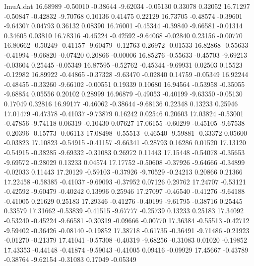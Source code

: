 \begin{filecontents}{ImuA.dat}
  16.68989   -0.50010   -0.38644   -9.62034   -0.05130    0.33078    0.32052
  16.71297   -0.50847   -0.42832   -9.70768    0.10136    0.41475    0.22129
  16.73705   -0.48574   -0.39601   -9.64307    0.04793    0.36132    0.08390
  16.76001   -0.45344   -0.39840   -9.66581   -0.01314    0.34605    0.03810
  16.78316   -0.45224   -0.42592   -9.64068   -0.02840    0.23156   -0.00770
  16.80662   -0.50249   -0.41157   -9.60479   -0.12763    0.26972   -0.01533
  16.82868   -0.55633   -0.41994   -9.66820   -0.07420    0.20866   -0.00006
  16.85276   -0.55633   -0.45703   -9.69213   -0.03604    0.25445   -0.05349
  16.87595   -0.52762   -0.45344   -9.69931    0.02503    0.15523   -0.12982
  16.89922   -0.44865   -0.37328   -9.63470   -0.02840    0.14759   -0.05349
  16.92244   -0.48455   -0.33260   -9.66102   -0.00551    0.19339    0.10680
  16.94564   -0.53958   -0.35055   -9.68854    0.05556    0.20102    0.28999
  16.96879   -0.49053   -0.40199   -9.63350   -0.05130    0.17049    0.32816
  16.99177   -0.46062   -0.38644   -9.68136    0.22348    0.13233    0.25946
  17.01479   -0.47378   -0.41037   -9.73879    0.16242    0.02546    0.20603
  17.03824   -0.53001   -0.47856   -9.74118    0.06319   -0.10430    0.07627
  17.06155   -0.60299   -0.45105   -9.67538   -0.20396   -0.15773   -0.06113
  17.08498   -0.55513   -0.46540   -9.59881   -0.33372    0.05600   -0.03823
  17.10823   -0.54915   -0.41157   -9.66341   -0.28793    0.16286    0.01520
  17.13120   -0.54915   -0.38285   -9.69332   -0.31083    0.26972    0.11443
  17.15448   -0.54078   -0.35653   -9.69572   -0.28029    0.13233    0.04574
  17.17752   -0.50608   -0.37926   -9.64666   -0.34899   -0.02033    0.11443
  17.20129   -0.59103   -0.37926   -9.70529   -0.24213    0.20866    0.21366
  17.22458   -0.58385   -0.41037   -9.69093   -0.37952    0.07126    0.29762
  17.24707   -0.53121   -0.42592   -9.60479   -0.40242    0.13996    0.25946
  17.27097   -0.46540   -0.41276   -9.64188   -0.41005    0.21629    0.25183
  17.29346   -0.41276   -0.40199   -9.61795   -0.38716    0.25445    0.33579
  17.31662   -0.53839   -0.41515   -9.67777   -0.25739    0.13233    0.25183
  17.34092   -0.53240   -0.45224   -9.66581   -0.30319   -0.09666   -0.00770
  17.36384   -0.55513   -0.42712   -9.59402   -0.36426   -0.08140   -0.19852
  17.38718   -0.61735   -0.36491   -9.71486   -0.21923   -0.01270   -0.21379
  17.41041   -0.57308   -0.40319   -9.68256   -0.31083    0.01020   -0.19852
  17.43353   -0.44148   -0.41874   -9.59043   -0.41005    0.09416   -0.09929
  17.45667   -0.43789   -0.38764   -9.62154   -0.31083    0.17049   -0.05349

\end{filecontents}
